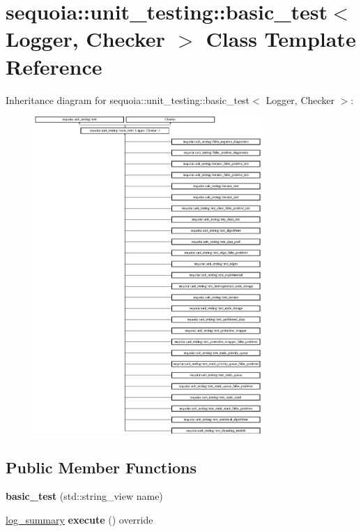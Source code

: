 \hypertarget{classsequoia_1_1unit__testing_1_1basic__test}{}\section{sequoia\+::unit\+\_\+testing\+::basic\+\_\+test$<$ Logger, Checker $>$ Class Template Reference}
\label{classsequoia_1_1unit__testing_1_1basic__test}
Inheritance diagram for sequoia\+::unit\+\_\+testing\+::basic\+\_\+test$<$ Logger, Checker $>$\+:\begin{figure}[H]
\begin{center}
\leavevmode
\includegraphics[height=12.000000cm]{classsequoia_1_1unit__testing_1_1basic__test}
\end{center}
\end{figure}
\subsection*{Public Member Functions}
\begin{DoxyCompactItemize}
\item 
\mbox{\label{classsequoia_1_1unit__testing_1_1basic__test_a96e0b92c670ca7d52e182165d64b9a77}} 
{\bfseries basic\+\_\+test} (std\+::string\+\_\+view name)
\item 
\mbox{\label{classsequoia_1_1unit__testing_1_1basic__test_a73dcdee1131b8bc4388a0dff86f10b40}} 
\mbox{\hyperlink{classsequoia_1_1unit__testing_1_1log__summary}{log\+\_\+summary}} {\bfseries execute} () override
\end{DoxyCompactItemize}
